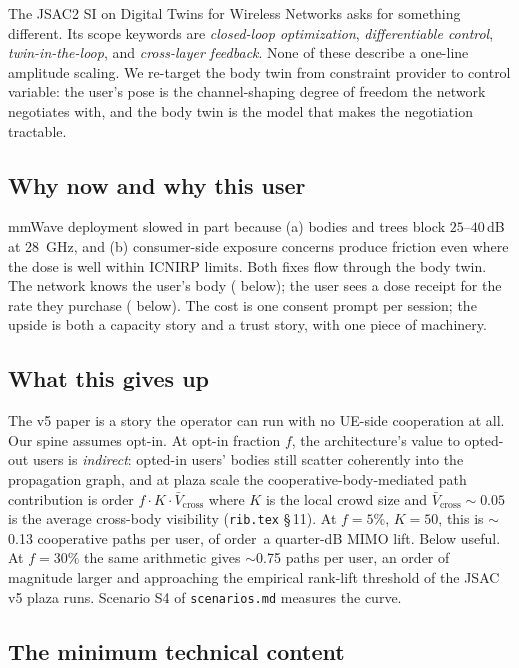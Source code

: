\documentclass[11pt,a4paper]{article}
\theoremstyle{definition}
\begin{document}
The JSAC2 SI on Digital Twins for Wireless Networks asks for
something different.  Its scope keywords are \emph{closed-loop
optimization}, \emph{differentiable control},
\emph{twin-in-the-loop}, and \emph{cross-layer feedback}.  None of
these describe a one-line amplitude scaling.  We re-target the body
twin from constraint provider to control variable: the user's pose
is the channel-shaping degree of freedom the network negotiates
with, and the body twin is the model that makes the negotiation
tractable.

\subsection{Why now and why this user}

mmWave deployment slowed in part because (a) bodies and trees block
$25\text{--}40$\,dB at \SI{28}{GHz}, and (b) consumer-side
exposure concerns produce friction even where the dose is well
within ICNIRP limits.  Both fixes flow through the body twin.  The
network knows the user's body ( below); the user
sees a dose receipt for the rate they purchase (
below).  The cost is one consent prompt per session; the upside is
both a capacity story and a trust story, with one piece of
machinery.

\subsection{What this gives up}

The v5 paper is a story the operator can run with no UE-side
cooperation at all.  Our spine assumes opt-in.  At opt-in fraction
$f$, the architecture's value to opted-out users is \emph{indirect}:
opted-in users' bodies still scatter coherently into the propagation
graph, and at plaza scale the cooperative-body-mediated path
contribution is order $f\cdot K\cdot\bar V_{\mathrm{cross}}$ where
$K$ is the local crowd size and $\bar V_{\mathrm{cross}}\sim 0.05$
is the average cross-body visibility (\texttt{rib.tex} \S\,11).  At
$f=5\%$, $K=50$, this is $\sim$0.13 cooperative paths per user, of
order\ a quarter-dB MIMO lift.  Below useful.  At $f=30\%$ the same
arithmetic gives $\sim$0.75 paths per user, an order of magnitude
larger and approaching the empirical rank-lift threshold of the
JSAC v5 plaza runs.  Scenario S4 of \texttt{scenarios.md} measures
the curve.

\subsection{The minimum technical content}
\end{document}
